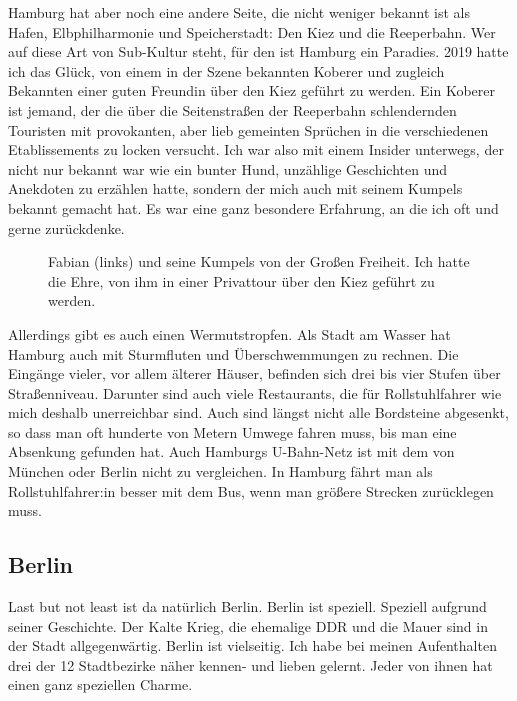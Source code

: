 \documentclass[fontsize=14pt,a4paper,headinclude,DIV=calc,automark]{scrbook}
\begin{document}
Hamburg hat aber noch eine andere Seite, die nicht weniger bekannt ist als Hafen, Elbphilharmonie und Speicherstadt: Den Kiez und die Reeperbahn. Wer auf diese Art von Sub-Kultur steht, für den ist Hamburg ein Paradies. 2019 hatte ich das Glück, von einem in der Szene bekannten Koberer und zugleich Bekannten einer guten Freundin über den Kiez geführt zu werden. Ein Koberer ist jemand, der die über die Seitenstraßen der Reeperbahn schlendernden Touristen mit provokanten, aber lieb gemeinten Sprüchen in die verschiedenen Etablissements zu locken versucht. Ich war also mit einem Insider unterwegs, der nicht nur bekannt war wie ein bunter Hund, unzählige Geschichten und Anekdoten zu erzählen hatte, sondern der mich auch mit seinem Kumpels bekannt gemacht hat. Es war eine ganz besondere Erfahrung, an die ich oft und gerne zurückdenke.

\setlength{\fboxsep}{0pt}    %
\setlength{\fboxrule}{0.2pt} %
\begin{figure}[ht]
    \raggedright
    \caption{Fabian (links) und seine Kumpels von der Großen Freiheit. Ich hatte die Ehre, von ihm in einer Privattour über den Kiez geführt zu werden.}
    \label{fig:hamburg}
\end{figure}

Allerdings gibt es auch einen Wermutstropfen. Als Stadt am Wasser hat Hamburg auch mit Sturmfluten und Überschwemmungen zu rechnen. Die Eingänge vieler, vor allem älterer Häuser, befinden sich drei bis vier Stufen über Straßenniveau. Darunter sind auch viele Restaurants, die für Rollstuhlfahrer wie mich deshalb unerreichbar sind. Auch sind längst nicht alle Bordsteine abgesenkt, so dass man oft hunderte von Metern Umwege fahren muss, bis man eine Absenkung gefunden hat. Auch Hamburgs U-Bahn-Netz ist mit dem von München oder Berlin nicht zu vergleichen. In Hamburg fährt man als Rollstuhlfahrer:in besser mit dem Bus, wenn man größere Strecken zurücklegen muss.

\subsection{Berlin}

Last but not least ist da natürlich Berlin. Berlin ist speziell. Speziell aufgrund seiner Geschichte. Der Kalte Krieg, die ehemalige DDR und die Mauer sind in der Stadt allgegenwärtig. Berlin ist vielseitig. Ich habe bei meinen Aufenthalten drei der 12 Stadtbezirke näher kennen- und lieben gelernt. Jeder von ihnen hat einen ganz speziellen Charme.
\end{document}
